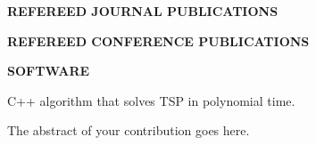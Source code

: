 {\pagebreak

\textbf{REFEREED JOURNAL PUBLICATIONS}


\vspace{12pt}
\textbf{REFEREED CONFERENCE PUBLICATIONS}


\vspace{12pt}
\textbf{SOFTWARE}

  {C++ algorithm that solves TSP in polynomial time.}

}

\thesisabstract
{
  The abstract of your contribution goes here.
}


